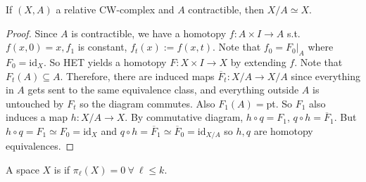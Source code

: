 \documentclass[12pt,class=article,crop=false]{standalone}
\begin{document}
\begin{lem}
If $ (X,A)$ a relative CW-complex and  $ A$ contractible, then  $ X / A \simeq X$.
\end{lem}

\begin{proof}
Since $ A$ is contractible, we have a homotopy $ f: A \times I \to A$ s.t.\ $ f(x,0)=x, f_1$ is constant, $ f_t(x):=f(x,t)$. Note that $ f_0 = F_0|_A$ where $ F_0 = \text{id}_{ X}$. So HET yields a homotopy $ F: X \times I \to X$ by extending $ f$. Note that  $ F_t(A) \subseteq A$. Therefore, there are induced maps $ \overline{ F}_t: X /A \to X /A$ since everything in $ A$ gets sent to the same equivalence class, and everything outside  $ A$ is untouched by  $ F_t$ so the diagram commutes. Also $ F_1(A)=$pt. So $ F_1$ also induces a map $ h: X /A \to X$. By commutative diagram, $ h \circ q = F_1$, $ q \circ h = \overline{ F}_1$. But $ h \circ q = F_1 \simeq F_0 = \text{id}_{ X}$ and $ q \circ h = \overline{F}_1 \simeq \overline{F}_0 = \text{id}_{ X /A}$ so $ h,q$ are homotopy equivalences.
\end{proof}

\begin{defn}
	A space $ X$ is   if $ \pi_{\ell} (X) =0 \ \forall \ \ell\leq k$.
\end{defn}
\end{document}
